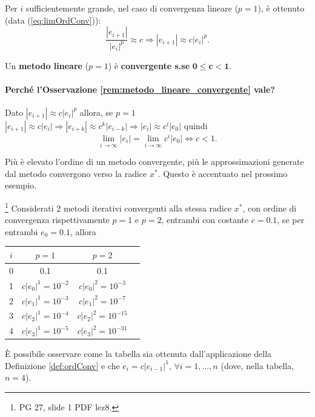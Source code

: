 \begin{remark}\label{rem:limOrdConv}
	Per $i$ sufficientemente grande, nel caso di convergenza lineare ($p=1$), è ottenuto (data (\ref{eq:limOrdConv})):
	\begin{equation*}
		\frac{|e_{i+1}|}{|e_i|^p}\approx c \Rightarrow |e_{i+1}|\approx c|e_i|^p.
	\end{equation*}
\end{remark}

\begin{remark}\label{rem:metodo_lineare_convergente}
	Un \textbf{metodo lineare} ($p=1$) è \textbf{convergente s.se} $\boldsymbol{0\leq c<1}$.
\end{remark}

\paragraph{Perché l'Osservazione \ref{rem:metodo_lineare_convergente} vale?} Dato $|e_{i+1}|\approx c|e_i|^p$ allora, se $p=1$ $|e_{i+1}|\approx c|e_i|\Rightarrow |e_{i+k}|\approx c^k|e_{i-k}|\Rightarrow |e_i|\approx c^i|e_0|$ quindi
\begin{equation*}
	\underset{i\to\infty}{\lim}|e_i|=\underset{i\to\infty}{\lim}{c^i|e_0|}\iff c<1.
\end{equation*}

Più è elevato l'ordine di un metodo convergente, più le approssimazioni generate dal metodo convergono verso la radice $x^*$. Questo è accentuato nel prossimo esempio.

\begin{example}
	\footnote{PG 27, slide 1 PDF lez8.} Considerati 2 metodi iterativi convergenti alla stessa radice $x^*$, con ordine di convergenza rispettivamente $p=1$ e $p=2$, entrambi con costante $c=0.1$, se per entrambi $e_0=0.1$, allora
	\begin{center}
		\begin{tabular}{ |c|c|c|c| } 
			\hline
			$i$ & $p=1$ & $p=2$ \\
			\hline
			0 & 0.1 & 0.1 \\ 
			1 & $c|e_0|^1=10^{-2}$ & $c|e_0|^2=10^{-3}$ \\ 
			2 & $c|e_1|^1=10^{-3}$ & $c|e_1|^2=10^{-7}$\\
			3 & $c|e_2|^1=10^{-4}$ & $c|e_2|^2=10^{-15}$\\
			4 & $c|e_3|^1=10^{-5}$ & $c|e_3|^2=10^{-31}$\\
			\hline
		\end{tabular}
	\end{center}
	
	È possibile osservare come la tabella sia ottenuta dall'applicazione della Definizione \ref{def:ordConv} e che $e_i=c|e_{i-1}|^1,\, \forall i=1,\hdots , n$ (dove, nella tabella, $n=4$).
\end{example}

